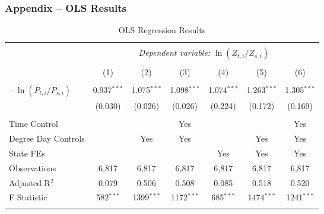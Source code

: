 \documentclass[aspectratio=169]{beamer}
\begin{document}
\begin{frame}
\frametitle{Appendix -- OLS Results}

\begin{table}[t] \centering 
	\caption{OLS Regression Results}
	\label{table:1} 
	\footnotesize
	\begin{tabular}{@{\extracolsep{5pt}}lcccccc} 
		\\[-5ex]\hline  
		\hline \\[-1.8ex] 
		& \multicolumn{6}{c}{\textit{Dependent variable:} $\ln (Z_{ t, i} / Z_{ s, i})$} \\ [0.5ex]
		\cline{2-7} 
		\\[-1.8ex] & (1) & (2) & (3) & (4) & (5) & (6)\\ [0.5ex]
		\hline \\[-1.8ex] 
		$-\ln (P_{t,i} / P_{s,i})$ & 0.937$^{***}$ & 1.075$^{***}$ & 1.098$^{***}$ & 1.074$^{***}$ & 1.263$^{***}$ & 1.305$^{***}$ \\ 
		& (0.030) & (0.026) & (0.026) & (0.224) & (0.172) & (0.169) \\  [0.9ex]
		\hline \\[-1.8ex] 
		Time Control &   &   & Yes &   &   & Yes  \\ 
		Degree Day Controls &   & Yes  & Yes &   & Yes  & Yes \\ 
		State FEs &   &   &   & Yes & Yes & Yes \\ 
		Observations & 6,817 & 6,817 & 6,817 & 6,817 & 6,817 & 6,817 \\ 
		Adjusted R$^{2}$ & 0.079 & 0.506 & 0.508 & 0.085 & 0.518 & 0.520 \\  
		F Statistic & 582$^{***}$  & 1399$^{***}$  & 1172$^{***}$ & 685$^{***}$  & 1474$^{***}$  & 1241$^{***}$  \\ [0.5ex]
		\hline 
		\hline \\[-1.8ex] 
	\end{tabular} 
\end{table}

\end{frame}
\end{document}
